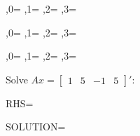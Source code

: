 \documentclass[a4paper]{article}
\begin{document}
	,0\of\pgfplotsmatrix=\pgfmathresult
{}	,1\of\pgfplotsmatrix=\pgfmathresult
{}	,2\of\pgfplotsmatrix=\pgfmathresult
{}	,3\of\pgfplotsmatrix=\pgfmathresult

	,0\of\pgfplotsmatrix=\pgfmathresult
{}	,1\of\pgfplotsmatrix=\pgfmathresult
{}	,2\of\pgfplotsmatrix=\pgfmathresult
{}	,3\of\pgfplotsmatrix=\pgfmathresult

	,0\of\pgfplotsmatrix=\pgfmathresult
{}	,1\of\pgfplotsmatrix=\pgfmathresult
{}	,2\of\pgfplotsmatrix=\pgfmathresult
{}	,3\of\pgfplotsmatrix=\pgfmathresult
\showfourxfour

\of\pgfplotsperm{}
\of\pgfplotsperm{}
\of\pgfplotsperm{}
\of\pgfplotsperm{}
\fi

Solve $Ax = \begin{bmatrix}1 & 5 & -1& 5\end{bmatrix}'$:
\pgfplotsarraynew{}

RHS=
\pgfplotsarrayforeach\pgfplotsrhs\as\elem{%
	\pgfplotsarrayforeachindex: \pgfmathprintnumber\elem\par
}%

SOLUTION=
\pgfplotsmatrixLUbacksubst\pgfplotsmatrix\perm\pgfplotsperm\inout\pgfplotsrhs

\pgfplotsarrayforeach\pgfplotsrhs\as\elem{%
	\pgfplotsarrayforeachindex: \pgfmathprintnumber\elem\par
}%
\end{document}
